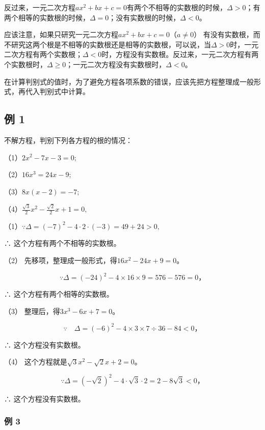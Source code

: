 反过来，一元二次方程\(ax^2 + bx + c = 0\)有两个不相等的实数根的时候，\(\Delta > 0\)；有两个相等的实数根的时候，\(\Delta = 0\)；没有实数根的时候，\(\Delta < 0\)。

应该注意，如果只研究一元二次方程\(ax^2 + bx + c = 0\)（\(a \neq 0\)）
有没有实数根，而不研究这两个根是不相等的实数根还是相等的实数根，可以说，当\(\Delta > 0\)时，一元二次方程有两个实数根；\(\Delta < 0\)时，方程没有实数根。反过来，一元二次方程有两个实数根时，\(\Delta \geqslant 0\)；一元二次方程没有实数根时，\(\Delta < 0\)。

在计算判别式的值时，为了避免方程各项系数的错误，应该先把方程整理成一般形式，再代入判别式中计算。

\subsection{例 1}

不解方程，判别下列各方程的根的情况：

（1）\(2x^{2} - 7x - 3 = 0;\)

（2）\(16x^{3} = 24x - 9;\)

（3）\(8x(x - 2) = -7;\)

（4）\(\frac{\sqrt{3}}{2} x^2 - \frac{\sqrt{2}}{2} x + 1 = 0,\)

（1）\(\because \Delta = (-7)^{2} - 4 \cdot 2 \cdot (-3) = 49 + 24 > 0,\)

∴ 这个方程有两个不相等的实数根。

（2） 先移项，整理成一般形式，得\(16x^{2} - 24x + 9 = 0\)。

\[
\because \Delta = (- 24) ^ {2} - 4 \times 16 \times 9 = 576 - 576 = 0\text{，}
\]

∴ 这个方程有两个相等的实数根。

（3） 整理后，得\(3x^{3} - 6x + 7 = 0\)。

\[
\because \quad \Delta = (- 6) ^ {2} - 4 \times 3 \times 7 \div 36 - 84 <   0\text{，}
\]

∴ 这个方程没有实数根。

（4） 这个方程就是\(\sqrt{3} x^{2} - \sqrt{2} x + 2 = 0\)。

\[
\because \Delta = (- \sqrt {2}) ^ {2} - 4 \cdot \sqrt {3} \cdot 2 = 2 - 8 \sqrt {3} <   0\text{，}
\]

∴ 这个方程没有实数根。

\subsubsection{例 3}

